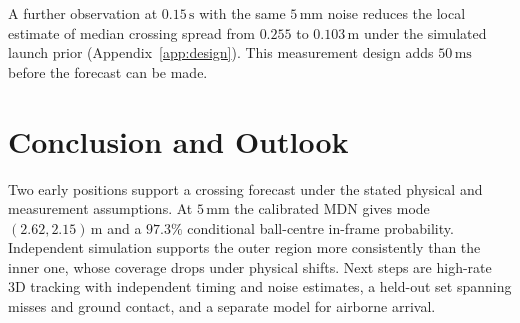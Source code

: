 \documentclass[11pt,a4paper]{article}
\begin{document}
A further observation at $0.15\,\mathrm{s}$ with the same $5\,\mathrm{mm}$ noise reduces the local estimate of median crossing spread from $0.255$ to $0.103\,\mathrm{m}$ under the simulated launch prior (Appendix~\ref{app:design}). This measurement design adds $50\,\mathrm{ms}$ before the forecast can be made.

\section{Conclusion and Outlook}

Two early positions support a crossing forecast under the stated physical and measurement assumptions. At $5\,\mathrm{mm}$ the calibrated MDN gives mode $(2.62,2.15)\,\mathrm{m}$ and a $97.3\%$ conditional ball-centre in-frame probability. Independent simulation supports the outer region more consistently than the inner one, whose coverage drops under physical shifts. Next steps are high-rate 3D tracking with independent timing and noise estimates, a held-out set spanning misses and ground contact, and a separate model for airborne arrival.
\end{document}
